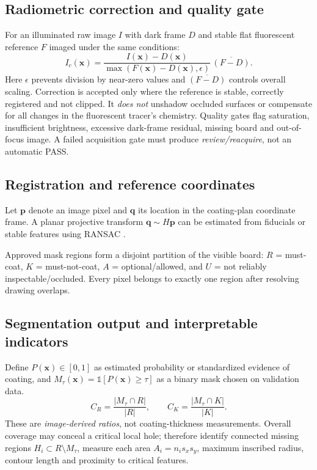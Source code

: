 \subsection{Radiometric correction and quality gate}
For an illuminated raw image $I$ with dark frame $D$ and stable flat fluorescent reference $F$ imaged under the same conditions:
\begin{equation}
I_c(\mathbf{x}) = \frac{I(\mathbf{x})-D(\mathbf{x})}{\max(F(\mathbf{x})-D(\mathbf{x}),\epsilon)}\,\overline{(F-D)}.
\label{eq:flatfield}
\end{equation}
Here $\epsilon$ prevents division by near-zero values and $\overline{(F-D)}$ controls overall scaling. Correction is accepted only where the reference is stable, correctly registered and not clipped. It \emph{does not} unshadow occluded surfaces or compensate for all changes in the fluorescent tracer's chemistry. Quality gates flag saturation, insufficient brightness, excessive dark-frame residual, missing board and out-of-focus image. A failed acquisition gate must produce \emph{review/reacquire}, not an automatic PASS.

\subsection{Registration and reference coordinates}
Let $\mathbf{p}$ denote an image pixel and $\mathbf{q}$ its location in the coating-plan coordinate frame. A planar projective transform $\mathbf{q}\sim H\mathbf{p}$ can be estimated from fiducials or stable features using RANSAC \citep{fischler1981ransac,zhang2000calibration}.

Approved mask regions form a disjoint partition of the visible board: $R$ = must-coat, $K$ = must-not-coat, $A$ = optional/allowed, and $U$ = not reliably inspectable/occluded. Every pixel belongs to exactly one region after resolving drawing overlaps.

\subsection{Segmentation output and interpretable indicators}
Define $P(\mathbf{x})\in[0,1]$ as estimated probability or standardized evidence of coating, and $M_\tau(\mathbf{x})=\mathbb{1}[P(\mathbf{x})\geq\tau]$ as a binary mask chosen on validation data.
\begin{equation}
C_R=\frac{|M_\tau\cap R|}{|R|},\qquad
C_K=\frac{|M_\tau\cap K|}{|K|}.
\end{equation}
These are \emph{image-derived ratios}, not coating-thickness measurements. Overall coverage may conceal a critical local hole; therefore identify connected missing regions $H_i\subset R\setminus M_\tau$, measure each area $A_i = n_i s_xs_y$, maximum inscribed radius, contour length and proximity to critical features.

